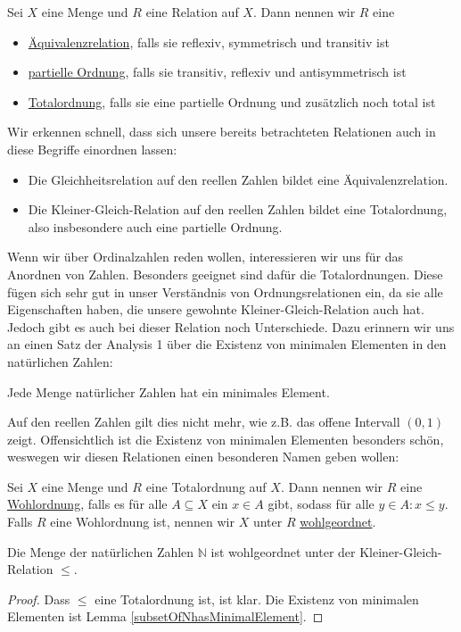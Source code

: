 \documentclass[11pt]{scrartcl}
\newcommand{\N}{\mathbb{N}}
\begin{document}
\begin{definition}
	Sei $X$ eine Menge und $R$ eine Relation auf $X$. Dann nennen wir $R$ eine 
	\begin{itemize}
		\item \underline{Äquivalenzrelation}, falls sie reflexiv, symmetrisch und transitiv ist
		\item \underline{partielle Ordnung}, falls sie transitiv, reflexiv und antisymmetrisch ist
		\item \underline{Totalordnung}, falls sie eine partielle Ordnung und zusätzlich noch total ist
	\end{itemize}
\end{definition}
\begin{example}
	Wir erkennen schnell, dass sich unsere bereits betrachteten Relationen auch in diese Begriffe einordnen lassen:	
	\begin{itemize}
		\item Die Gleichheitsrelation auf den reellen Zahlen bildet eine Äquivalenzrelation.
		\item Die Kleiner-Gleich-Relation auf den reellen Zahlen bildet eine Totalordnung, also insbesondere auch eine partielle Ordnung.
	\end{itemize}
\end{example}
Wenn wir über Ordinalzahlen reden wollen, interessieren wir uns für das Anordnen von Zahlen. Besonders geeignet sind dafür die Totalordnungen. Diese fügen sich sehr gut in unser Verständnis von Ordnungsrelationen ein, da sie alle Eigenschaften haben, die unsere gewohnte Kleiner-Gleich-Relation auch hat. \\
Jedoch gibt es auch bei dieser Relation noch Unterschiede. Dazu erinnern wir uns an einen Satz der Analysis 1 über die Existenz von minimalen Elementen in den natürlichen Zahlen:
\begin{lemma}\label{subsetOfNhasMinimalElement} Jede Menge natürlicher Zahlen hat ein minimales Element.
\end{lemma}
Auf den reellen Zahlen gilt dies nicht mehr, wie z.B. das offene Intervall $(0,1)$ zeigt. Offensichtlich ist die Existenz von minimalen Elementen besonders schön, weswegen wir diesen Relationen einen besonderen Namen geben wollen:
\begin{definition}
	Sei $X$ eine Menge und $R$ eine Totalordnung auf $X$. Dann nennen wir $R$ eine \underline{Wohlordnung}, falls es für alle $A\subseteq X$ ein $x\in A$ gibt, sodass für alle $y\in A: x\leq y$. Falls $R$ eine Wohlordnung ist, nennen wir $X$ unter $R$ \underline{wohlgeordnet}.
\end{definition}
\begin{theorem}
	Die Menge der natürlichen Zahlen $\N$ ist wohlgeordnet unter der Kleiner-Gleich-Relation $\leq$.
\end{theorem}
\begin{proof}
	Dass $\leq$ eine Totalordnung ist, ist klar. Die Existenz von minimalen Elementen ist Lemma \ref{subsetOfNhasMinimalElement}.
\end{proof}
\end{document}

